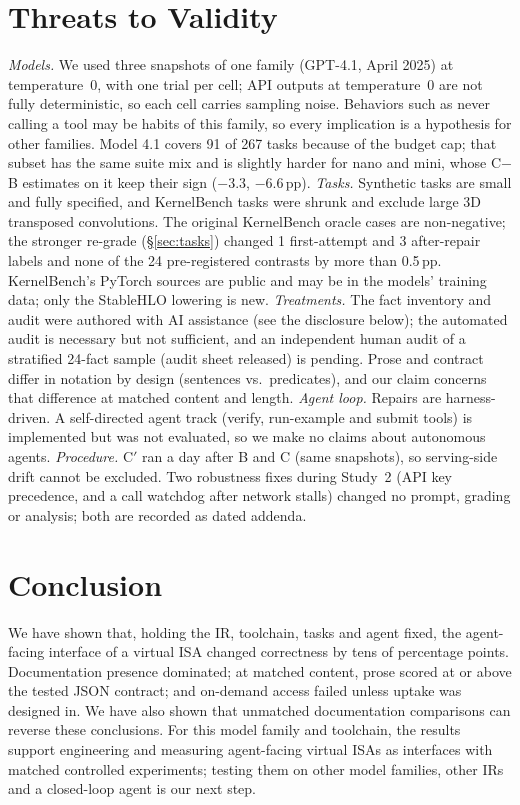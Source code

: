 \documentclass[conference]{IEEEtran}
\newcommand{\pp}{\,pp}
\begin{document}
\section{Threats to Validity}
\emph{Models.} We used three snapshots of one family (GPT-4.1, April 2025) at temperature~0, with one trial per cell; API outputs at temperature~0 are not fully deterministic, so each cell carries sampling noise. Behaviors such as never calling a tool may be habits of this family, so every implication is a hypothesis for other families. Model 4.1 covers 91 of 267 tasks because of the budget cap; that subset has the same suite mix and is slightly harder for nano and mini, whose C$-$B estimates on it keep their sign ($-3.3$, $-6.6$\pp).
\emph{Tasks.} Synthetic tasks are small and fully specified, and KernelBench tasks were shrunk and exclude large 3D transposed convolutions. The original KernelBench oracle cases are non-negative; the stronger re-grade (\S\ref{sec:tasks}) changed 1 first-attempt and 3 after-repair labels and none of the 24 pre-registered contrasts by more than 0.5\pp. KernelBench's PyTorch sources are public and may be in the models' training data; only the StableHLO lowering is new.
\emph{Treatments.} The fact inventory and audit were authored with AI assistance (see the disclosure below); the automated audit is necessary but not sufficient, and an independent human audit of a stratified 24-fact sample (audit sheet released) is pending. Prose and contract differ in notation by design (sentences vs.\ predicates), and our claim concerns that difference at matched content and length.
\emph{Agent loop.} Repairs are harness-driven. A self-directed agent track (verify, run-example and submit tools) is implemented but was not evaluated, so we make no claims about autonomous agents.
\emph{Procedure.} C$'$ ran a day after B and C (same snapshots), so serving-side drift cannot be excluded. Two robustness fixes during Study~2 (API key precedence, and a call watchdog after network stalls) changed no prompt, grading or analysis; both are recorded as dated addenda.

\section{Conclusion}
We have shown that, holding the IR, toolchain, tasks and agent fixed, the agent-facing interface of a virtual ISA changed correctness by tens of percentage points. Documentation presence dominated; at matched content, prose scored at or above the tested JSON contract; and on-demand access failed unless uptake was designed in. We have also shown that unmatched documentation comparisons can reverse these conclusions. For this model family and toolchain, the results support engineering and measuring agent-facing virtual ISAs as interfaces with matched controlled experiments; testing them on other model families, other IRs and a closed-loop agent is our next step.
\end{document}
